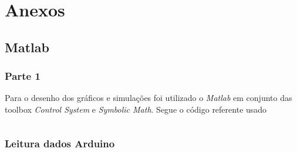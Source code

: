 \documentclass[a4paper,11pt]{article}
\begin{document}

\newpage

\nocite{matlabcontrol}
\nocite{matlabsymbolic}
\nocite{ogata2010modern}

\section*{Anexos}



\subsection*{Matlab}

\subsubsection*{Parte 1}
Para o desenho dos gráficos e simulações foi utilizado o \textit{Matlab} em conjunto das toolbox \textit{Control System}\cite{matlabcontrol} e \textit{Symbolic Math}\cite{matlabsymbolic}. Segue o código referente usado

\inputminted[xleftmargin=15pt,linenos,frame=single,framesep=5pt,breaklines=true]{matlab}{../matlab/project.m}

\newpage
\subsubsection*{Leitura dados Arduino}
\inputminted[xleftmargin=15pt,linenos,frame=single,framesep=5pt,breaklines=true]{matlab}{../matlab/plotArduino.m}
\end{document}
